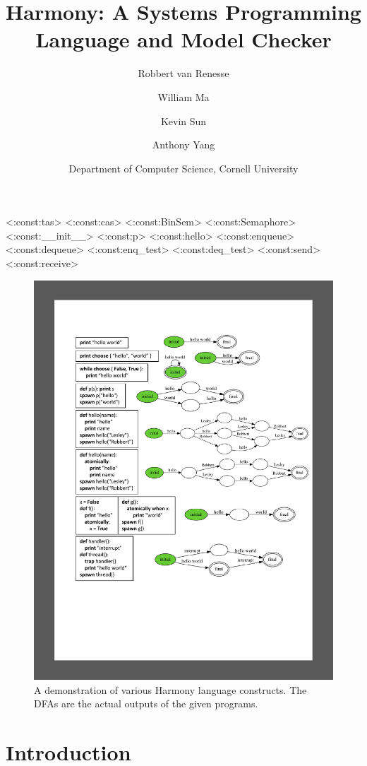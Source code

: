 \documentclass[twocolumn]{article}
\title{Harmony: A Systems Programming Language and Model Checker}
\author{Robbert van Renesse \and William Ma \and Kevin Sun \and Anthony Yang}
\date{Department of Computer Science, Cornell University}
\begin{document}
\maketitle

<{:const:tas}>
<{:const:cas}>
<{:const:BinSem}>
<{:const:Semaphore}>
<{:const:__init__}>
<{:const:p}>
<{:const:hello}>
<{:const:enqueue}>
<{:const:dequeue}>
<{:const:enq_test}>
<{:const:deq_test}>
<{:const:send}>
<{:const:receive}>

\begin{figure}
\begin{center}
\includegraphics[width=.9\textwidth]{hello.pdf}
\end{center}
\caption{A demonstration of various Harmony language constructs.  The DFAs
are the actual outputs of the given programs.}
\label{fig:helloworld}
\end{figure}

\section{Introduction}
\end{document}
